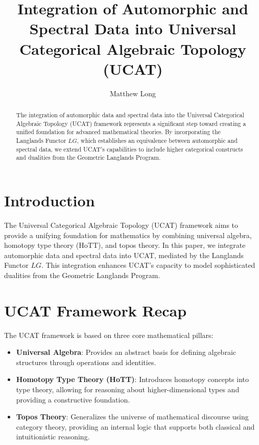 \documentclass{article}
\title{Integration of Automorphic and Spectral Data into Universal Categorical Algebraic Topology (UCAT)}
\author{Matthew Long}
\date{}
\begin{document}
\maketitle

\begin{abstract}
The integration of automorphic data and spectral data into the Universal Categorical Algebraic Topology (UCAT) framework represents a significant step toward creating a unified foundation for advanced mathematical theories. By incorporating the Langlands Functor \( LG \), which establishes an equivalence between automorphic and spectral data, we extend UCAT’s capabilities to include higher categorical constructs and dualities from the Geometric Langlands Program.
\end{abstract}

\tableofcontents

\section{Introduction}

The Universal Categorical Algebraic Topology (UCAT) framework aims to provide a unifying foundation for mathematics by combining universal algebra, homotopy type theory (HoTT), and topos theory. In this paper, we integrate automorphic data and spectral data into UCAT, mediated by the Langlands Functor \( LG \). This integration enhances UCAT’s capacity to model sophisticated dualities from the Geometric Langlands Program.

\section{UCAT Framework Recap}

The UCAT framework is based on three core mathematical pillars:

\begin{itemize}
    \item \textbf{Universal Algebra}: Provides an abstract basis for defining algebraic structures through operations and identities.
    \item \textbf{Homotopy Type Theory (HoTT)}: Introduces homotopy concepts into type theory, allowing for reasoning about higher-dimensional types and providing a constructive foundation.
    \item \textbf{Topos Theory}: Generalizes the universe of mathematical discourse using category theory, providing an internal logic that supports both classical and intuitionistic reasoning.
\end{itemize}
\end{document}
